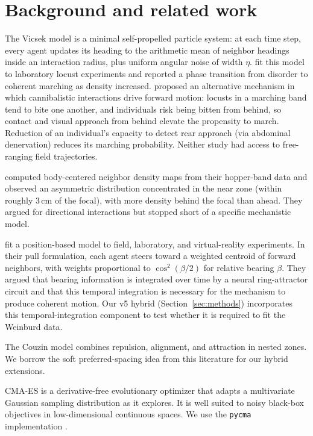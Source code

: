 \documentclass[11pt]{article}
\begin{document}
\section{Background and related work}

The Vicsek model \citep{vicsek1995} is a minimal self-propelled particle
system: at each time step, every agent updates its heading to the
arithmetic mean of neighbor headings inside an interaction radius, plus
uniform angular noise of width $\eta$. \citet{buhl2006} fit this model to
laboratory locust experiments and reported a phase transition from
disorder to coherent marching as density increased. \citet{bazazi2008}
proposed an alternative mechanism in which cannibalistic interactions
drive forward motion: locusts in a marching band tend to bite one
another, and individuals risk being bitten from behind, so contact and
visual approach from behind elevate the propensity to march.
Reduction of an individual's capacity to detect rear approach (via
abdominal denervation) reduces its marching probability. Neither study
had access to free-ranging field trajectories.

\citet{weinburd2024} computed body-centered neighbor density maps from
their hopper-band data and observed an asymmetric distribution
concentrated in the near zone (within roughly 3\,cm of the focal), with
more density behind the focal than ahead. They argued for directional
interactions but stopped short of a specific mechanistic model.

\citet{sayin2025} fit a position-based model to field, laboratory, and
virtual-reality experiments. In their pull formulation, each agent steers
toward a weighted centroid of forward neighbors, with weights proportional
to $\cos^2(\beta/2)$ for relative bearing $\beta$. They argued that
bearing information is integrated over time by a neural ring-attractor
circuit and that this temporal integration is necessary for the mechanism
to produce coherent motion. Our v5 hybrid (Section~\ref{sec:methods})
incorporates this temporal-integration component to test whether it is
required to fit the Weinburd data.

The Couzin model \citep{couzin2002} combines repulsion, alignment, and
attraction in nested zones. We borrow the soft preferred-spacing idea
from this literature for our hybrid extensions.

CMA-ES \citep{hansen2016} is a derivative-free evolutionary optimizer
that adapts a multivariate Gaussian sampling distribution as it explores.
It is well suited to noisy black-box objectives in low-dimensional
continuous spaces. We use the \texttt{pycma} implementation
\citep{pycma}.
\end{document}
